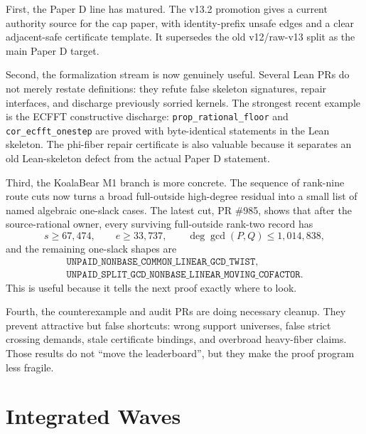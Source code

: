 \documentclass[a4paper,11pt]{amsart}
\begin{document}
First, the Paper D line has matured.  The v13.2 promotion gives a current
authority source for the cap paper, with identity-prefix unsafe edges and a
clear adjacent-safe certificate template.  It supersedes the old v12/raw-v13
split as the main Paper D target.

Second, the formalization stream is now genuinely useful.  Several Lean PRs do
not merely restate definitions: they refute false skeleton signatures, repair
interfaces, and discharge previously sorried kernels.  The strongest recent
example is the ECFFT constructive discharge: \texttt{prop\_rational\_floor} and
\texttt{cor\_ecfft\_onestep} are proved with byte-identical statements in the
Lean skeleton.  The phi-fiber repair certificate is also valuable because it
separates an old Lean-skeleton defect from the actual Paper D statement.

Third, the KoalaBear M1 branch is more concrete.  The sequence of rank-nine
route cuts now turns a broad full-outside high-degree residual into a small
list of named algebraic one-slack cases.  The latest cut, PR \#985, shows that
after the source-rational owner, every surviving full-outside rank-two record
has
\[
        s\ge 67{,}474,\qquad e\ge 33{,}737,\qquad
        \deg\gcd(P,Q)\le 1{,}014{,}838,
\]
and the remaining one-slack shapes are
\[
\begin{array}{c}
\texttt{UNPAID\_NONBASE\_COMMON\_LINEAR\_GCD\_TWIST},\\
\texttt{UNPAID\_SPLIT\_GCD\_NONBASE\_LINEAR\_MOVING\_COFACTOR}.
\end{array}
\]
This is useful because it tells the next proof exactly where to look.

Fourth, the counterexample and audit PRs are doing necessary cleanup.  They
prevent attractive but false shortcuts: wrong support universes, false strict
crossing demands, stale certificate bindings, and overbroad heavy-fiber claims.
Those results do not ``move the leaderboard'', but they make the proof program
less fragile.

\section{Integrated Waves}
\end{document}
